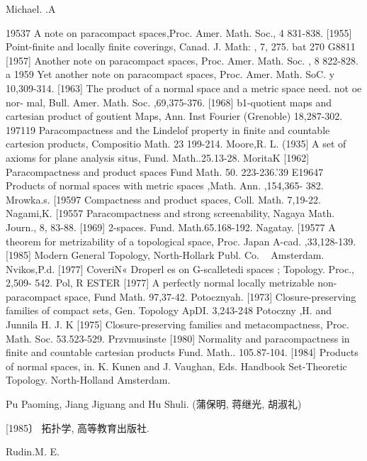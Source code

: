 \documentclass[main.tex]{subfiles}
\begin{document}
\noindent Michael. .A
{19537
	A note on paracompact spaces,Proc. Amer. Math. Soc., 4 831-838.
	[1955]
	Point-finite and locally finite coverings, Canad. J. Math: , 7, 275.
	bat 270
	G8811
	[1957]
	Another note on paracompact spaces, Proc. Amer. Math. Soc. , 8
	822-828.
	a 1959 Yet another note on paracompact spaces, Proc. Amer. Math.
	SoC. y
	10,309-314.
	[1963]
	The product of a normal space and a metric space
	need. not oe nor-
	mal, Bull. Amer. Math. Soc. ,69,375-376.
	[1968]
	b1-quotient maps and cartesian product of goutient Maps, Ann. Inst
	Fourier (Grenoble) 18,287-302.
	197119 Paracompactness and the Lindelof property in finite and countable
	cartesion products, Compositio Math. 23 199-214.
	Moore,R. L.
	(1935]
	A set of axioms for plane analysis situs, Fund. Math..25.13-28.
	MoritaK
	[1962]
	Paracompactness and product spaces Fund Math. 50. 223-236.'39
	E19647 Products of normal spaces with metric spaces ,Math. Ann. ,154,365-
	382.
	Mrowka.s.
	[19597 Compactness and product spaces, Coll. Math. 7,19-22.
	Nagami,K.
	[19557 Paracompactness and strong screenability, Nagaya Math. Journ., 8,
	83-88.
	[1969]
	2-spaces. Fund. Math.65.168-192.
	Nagatay.
	[19577 A theorem for metrizability of a topological space, Proc. Japan A-cad. ,33,128-139.
	[1985]
	Modern General Topology, North-Hollark Publ. Co.
	~ Amsterdam.
	Nvikos,P.d.
	[1977]
	CoveriN« Droperl
	es on G-scalletedi spaces ; Topology. Proc., 2,509-
	542.
	Pol, R
	ESTER
	[1977] A perfectly normal locally metrizable non-paracompact space, Fund
	Math.
	97,37-42.
	Potocznyah.
	[1973]
	Closure-preserving families of compact sets, Gen. Topology ApDI.
	3,243-248
	Potoczny ,H. and Junnila H. J. K
	[1975]%
	Closure-preserving
	families and metacompactness, Proc.
	Math. Soc.
	53.523-529.
	Przvmusinste
	[1980]
	Normality and paracompactness in finite and countable cartesian
	products Fund. Math.. 105.87-104.
	[1984]
	Products of normal spaces, in. K. Kunen and J. Vaughan, Eds.
	Handbook
	Set-Theoretic
	Topology.
	North-Holland
	Amsterdam.

\noindent Pu Paoming, Jiang Jiguang and Hu Shuli. (蒲保明, 蒋继光, 胡淑礼)
	
	[1985〕 拓扑学, 高等教育出版社.

\noindent Rudin.M. E.

}
\end{document}
